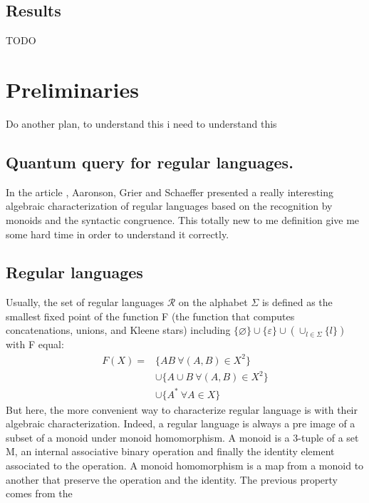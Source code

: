 \documentclass[11pt,a4paper]{article}
\theoremstyle{definition}
\theoremstyle{plain}
\theoremstyle{definition}
\begin{document}
\subsection{Results}

{\color{red} \Huge TODO}

\section{Preliminaries}\label{sec:preli}

{ \color{red} Do another plan, to understand this i need to understand this}

\subsection{Quantum query for regular languages.}

In the article \cite{trichotomy_not_andris}, Aaronson, Grier and Schaeffer presented
a really interesting algebraic characterization of regular languages based on the
recognition by monoids and the syntactic congruence. This totally new to me definition
give me some hard time in order to understand it correctly.

\subsection{Regular languages}

Usually, the set of regular languages $\mathcal{R}$ on the alphabet $\Sigma$ is defined as the smallest
fixed point of the function F (the function that computes concatenations, unions, and Kleene stars)
including $\{\varnothing\} \cup \{\varepsilon\} \cup(\cup_{l\in\Sigma}\{l\})$
with F equal:
\begin{align*}\label{eq:F}
    F(X) = & \{AB\  \forall (A,B)\in X^2\}            \\
           & \cup \{A\cup B\ \forall (A,B) \in X^2 \} \\
           & \cup \{A^*\ \forall A \in X \}
\end{align*}
But here, the more convenient way to characterize regular language is with their
algebraic characterization. Indeed, a regular language is always a pre image of a subset
of a monoid under monoid homomorphism. A monoid is a 3-tuple of a set M, an
internal associative binary operation and finally the identity element associated to the
operation. A monoid homomorphism is a map from a monoid to another that preserve the
operation and the identity. The previous property comes from the
\end{document}
